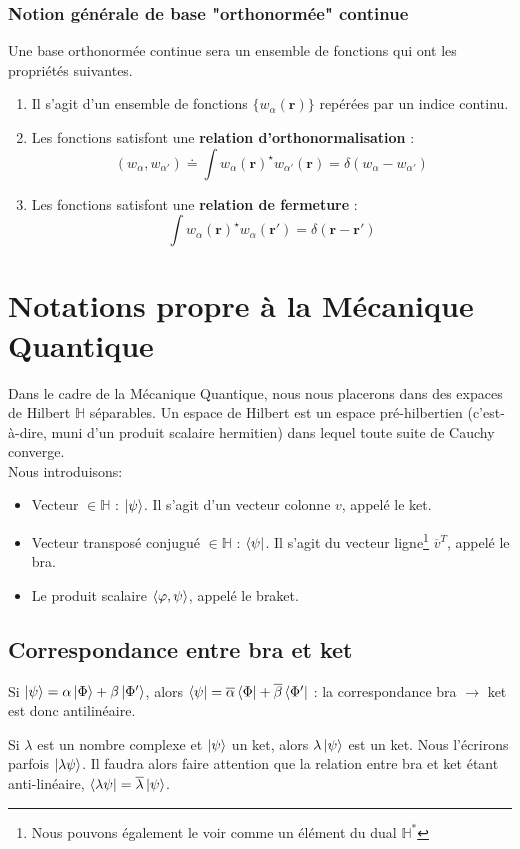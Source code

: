 \documentclass[../notesdecours.tex]{subfiles}
\begin{document}
\subsubsection{Notion générale de base "orthonormée" continue}
Une base orthonormée continue sera un ensemble de fonctions qui ont les propriétés suivantes.
\begin{enumerate}
\item Il s'agit d'un ensemble de fonctions $\{ w_\alpha(\bm{r})\}$ repérées par un indice continu. \\

\item Les fonctions satisfont une \textbf{relation d'orthonormalisation} :
$$(w_{\alpha}, w_{\alpha'}) \doteq \int w_{\alpha}(\bm{r})^\star w_{\alpha'}(\bm{r}) = \delta(w_{\alpha} - w_{\alpha'})$$

\item Les fonctions satisfont une \textbf{relation de fermeture} :
$$\int w_{\alpha}(\bm{r})^\star w_{\alpha}(\bm{r}') = \delta(\bm{r}-\bm{r}')$$
\end{enumerate}
\section{Notations propre à la Mécanique Quantique}
Dans le cadre de la Mécanique Quantique, nous nous placerons dans des expaces de Hilbert $\mathbb{H}$ séparables. Un espace de Hilbert est un espace pré-hilbertien (c'est-à-dire, muni d'un produit scalaire hermitien) dans lequel toute suite de Cauchy converge. \\

Nous introduisons:
\begin{itemize}
\item Vecteur $\in \mathbb{H}$ : $\ket{\psi}$. Il s'agit d'un vecteur colonne $v$, appelé le ket.
\item Vecteur transposé conjugué $\in \mathbb{H}$ : $\bra{\psi}$. Il s'agit du vecteur ligne\footnote{Nous pouvons également le voir comme un élément du dual $\mathbb{H}^*$} $\overline{v}^T$, appelé le bra.
\item Le produit scalaire $\braket{\varphi,\psi}$, appelé le braket.
\end{itemize}
\subsection{Correspondance entre bra et ket}
Si $\ket{\psi} = \alpha \ket{\Phi} + \beta\ket{\Phi'}$, alors $\bra{\psi} = \overline{\alpha}\bra{\Phi}+\overline{\beta}\bra{\Phi'}$ : la correspondance bra $\rightarrow$ ket est donc antilinéaire. 
\begin{remark} Si $\lambda$ est un nombre complexe et $\ket{\psi}$ un ket, alors $\lambda\ket{\psi}$ est un ket. Nous l'écrirons parfois $\ket{\lambda\psi}$. Il faudra alors faire attention que la relation entre bra et ket étant anti-linéaire, $\bra{\lambda\psi} = \overline{\lambda}\ket{\psi}$. \end{remark}
\end{document}
